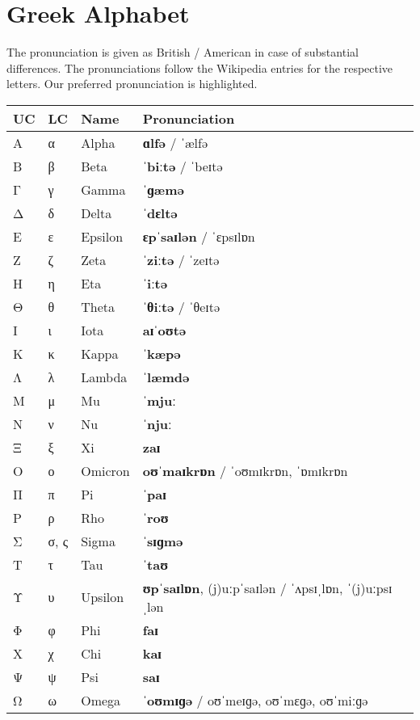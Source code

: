 
\section*{Greek Alphabet}

The pronunciation is given as British / American in case of substantial differences.
The pronunciations follow the Wikipedia entries for the respective letters.
Our preferred pronunciation is highlighted.

\begin{center}
  \begin{tabular}{llll}
    \toprule
    \textbf{UC} & \textbf{LC} & \textbf{Name} & \textbf{Pronunciation} \\
    \midrule
    Α & α	   & Alpha   & \textbf{ɑlfə} / ˈælfə \\
    Β & β	   & Beta    & \textbf{ˈbiːtə} / ˈbeɪtə \\
    Γ & γ	   & Gamma   & \textbf{ˈɡæmə} \\
    Δ & δ	   & Delta   & \textbf{ˈdɛltə} \\
    Ε & ε	   & Epsilon & \textbf{ɛpˈsaɪlən} / ˈɛpsɪlɒn \\
    Ζ & ζ	   & Zeta    & \textbf{ˈziːtə} / ˈzeɪtə \\
    Η & η	   & Eta     & \textbf{ˈiːtə} \\
    Θ & θ	   & Theta   & \textbf{ˈθiːtə} / ˈθeɪtə \\
    Ι & ι	   & Iota    & \textbf{aɪˈoʊtə} \\
    Κ & κ	   & Kappa   & \textbf{ˈkæpə} \\
    Λ & λ	   & Lambda  & \textbf{ˈlæmdə} \\
    Μ & μ	   & Mu      & \textbf{ˈmjuː} \\
    Ν & ν	   & Nu      & \textbf{ˈnjuː} \\
    Ξ & ξ	   & Xi      & \textbf{zaɪ} \\
    Ο & ο	   & Omicron & \textbf{oʊˈmaɪkrɒn} / ˈoʊmɪkrɒn, ˈɒmɪkrɒn \\
    Π & π	   & Pi      & \textbf{ˈpaɪ} \\
    Ρ & ρ	   & Rho     & \textbf{ˈroʊ} \\
    Σ & σ, ς & Sigma   & \textbf{ˈsɪɡmə} \\
    Τ & τ	   & Tau     & \textbf{ˈtaʊ} \\
    Υ & υ	   & Upsilon & \textbf{ʊpˈsaɪlɒn}, (j)uːpˈsaɪlən / ˈʌpsɪˌlɒn, ˈ(j)uːpsɪˌlən \\
    Φ & φ	   & Phi     & \textbf{faɪ} \\
    Χ & χ	   & Chi     & \textbf{kaɪ} \\
    Ψ & ψ	   & Psi     & \textbf{saɪ} \\
    Ω & ω	   & Omega   & \textbf{ˈoʊmɪɡə} / oʊˈmeɪɡə, oʊˈmɛɡə, oʊˈmiːɡə \\
    \bottomrule
  \end{tabular}
\end{center}
